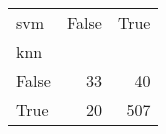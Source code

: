 \begin{tabular}{lrr}
\toprule
svm &  False &  True  \\
knn   &        &        \\
\midrule
False &     33 &     40 \\
True  &     20 &    507 \\
\bottomrule
\end{tabular}
